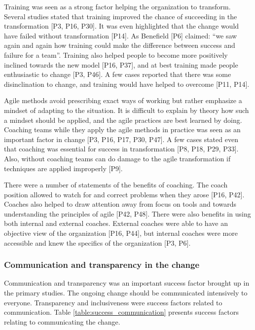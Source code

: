\documentclass[preprint,authoryear,12pt]{elsarticle}
\begin{document}
Training was seen as a strong factor helping the organization to transform.
Several studies stated that training improved the chance of succeeding in the
transformation [P3, P16, P30]. It was even highlighted that the change would have
failed without transformation [P14]. As Benefield [P6] claimed: ``we saw again
and again how training could make the difference between success and failure for
a team''. Training also helped people to become more positively inclined towards
the new model [P16, P37], and at best training made people enthusiastic to change
[P3, P46]. A few cases reported that there was some disinclination to change,
and training would have helped to overcome [P11, P14].

Agile methods avoid prescribing exact ways of working but rather emphasize a
mindset of adapting to the situation. It is difficult to explain by theory how
such a mindset should be applied, and the agile practices are best learned by
doing. Coaching teams while they apply the agile methods in practice was seen as
an important factor in change [P3, P16, P17, P30, P47]. A few cases stated even
that coaching was essential for success in transformation [P8, P18, P29, P33].
Also, without coaching teams can do damage to the agile transformation if
techniques are applied improperly [P9].

There were a number of statements of the benefits of coaching. The coach
position allowed to watch for and correct problems when they arose [P16, P42].
Coaches also helped to draw attention away from focus on tools and towards
understanding the principles of agile [P42, P48].
There were also benefits in using both internal and external coaches.
External coaches were able to have an objective view of the organization [P16,
P44], but internal coaches were more accessible and knew the specifics of the
organization [P3, P6].


\subsubsection{Communication and transparency in the change}

Communication and transparency was an important success factor brought up in the
primary studies. The ongoing change should be communicated intensively to
everyone. Transparency and inclusiveness were success factors related to
communication.
Table \ref{table:success_communication} presents success factors relating to
communicating the change.
\end{document}

